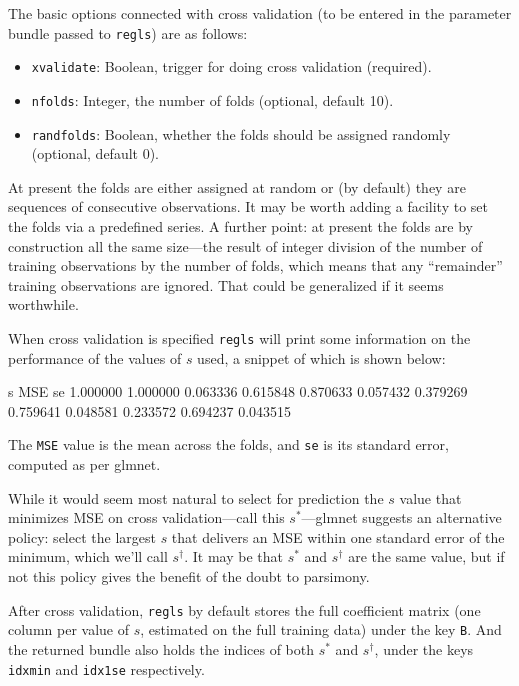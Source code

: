 \documentclass{article}
\begin{document}
The basic options connected with cross validation (to be entered in
the parameter bundle passed to \texttt{regls}) are as follows:
\begin{itemize}
\item \texttt{xvalidate}: Boolean, trigger for doing cross validation (required).
\item \texttt{nfolds}: Integer, the number of folds (optional, default
  10).
\item \texttt{randfolds}: Boolean, whether the folds should be
  assigned randomly (optional, default 0).
\end{itemize}

At present the folds are either assigned at random or (by default)
they are sequences of consecutive observations. It may be worth adding
a facility to set the folds via a predefined series. A further point:
at present the folds are by construction all the same size---the
result of integer division of the number of training observations by
the number of folds, which means that any ``remainder'' training
observations are ignored. That could be generalized if it seems
worthwhile.

When cross validation is specified \texttt{regls} will print some
information on the performance of the values of $s$ used, a
snippet of which is shown below:
\begin{code}
          s        MSE         se
   1.000000   1.000000   0.063336
   0.615848   0.870633   0.057432
   0.379269   0.759641   0.048581
   0.233572   0.694237   0.043515
\end{code}
%
The \texttt{MSE} value is the mean across the folds, and \texttt{se}
is its standard error, computed as per \textsf{glmnet}.

While it would seem most natural to select for prediction the $s$
value that minimizes MSE on cross validation---call this
$s^*$---\textsf{glmnet} suggests an alternative policy: select the
largest $s$ that delivers an MSE within one standard error of the
minimum, which we'll call $s^{\dagger}$. It may be that $s^*$ and
$s^{\dagger}$ are the same value, but if not this policy gives the
benefit of the doubt to parsimony.

After cross validation, \texttt{regls} by default stores the full
coefficient matrix (one column per value of $s$, estimated on the full
training data) under the key \texttt{B}.  And the returned bundle also
holds the indices of both $s^*$ and $s^{\dagger}$, under the keys
\texttt{idxmin} and \texttt{idx1se} respectively.
\end{document}

